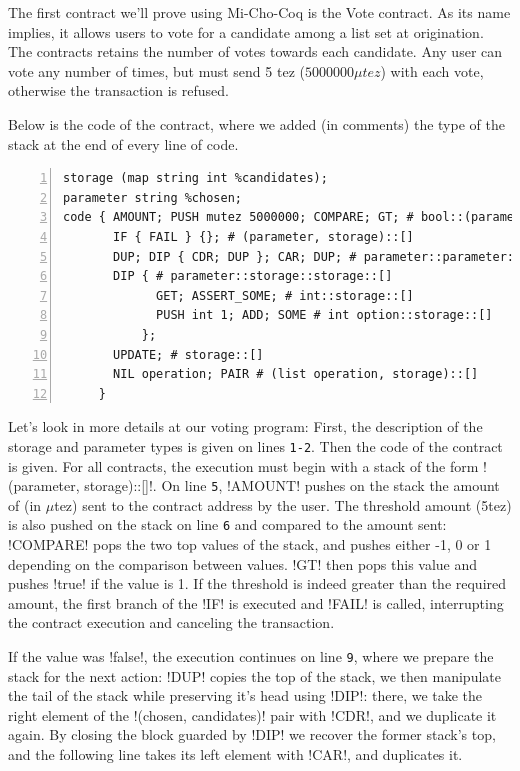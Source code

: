 \documentclass{report}
\begin{document}
The first contract we'll prove using Mi-Cho-Coq is the Vote contract. As its name implies, it allows users to vote for a candidate among a list set at origination. The contracts retains the number of votes towards each candidate. Any user can vote any number of times, but must send 5 tez ($5000000\mu tez$) with each vote, otherwise the transaction is refused.

Below is the code of the contract, where we added (in comments) the type of the stack at the end of every line of code.

\begin{lstlisting}[language=michelson,numbers=left]
storage (map string int %candidates);
parameter string %chosen;
code { AMOUNT; PUSH mutez 5000000; COMPARE; GT; # bool::(parameter, storage)::[]
       IF { FAIL } {}; # (parameter, storage)::[]
       DUP; DIP { CDR; DUP }; CAR; DUP; # parameter::parameter::storage::storage::[]
       DIP { # parameter::storage::storage::[]
             GET; ASSERT_SOME; # int::storage::[]
             PUSH int 1; ADD; SOME # int option::storage::[]
           };
       UPDATE; # storage::[]
       NIL operation; PAIR # (list operation, storage)::[]
     }
\end{lstlisting}

Let's look in more details at our voting program: First, the description of the
storage and parameter types is given on lines \texttt{1-2}.  Then the
code of the contract is given.
For all contracts, the execution must begin with a stack of the form !(parameter, storage)::[]!.
On line \texttt{5}, !AMOUNT! pushes on the stack the amount
of (in $\mu$tez) sent to the contract address by the user. The threshold amount
(5tez) is also pushed on the stack on line \texttt{6} and compared to
the amount sent:
!COMPARE! pops the two top values of the stack, and pushes
either -1, 0 or 1 depending on the comparison between
values. !GT! then pops this value and pushes !true!
if the value is 1. If the threshold is indeed greater than the
required amount, the first branch of the !IF! is executed
and !FAIL! is called, interrupting the contract execution
and canceling the transaction.

If the value was !false!, the execution continues on line
\texttt{9}, where we prepare the stack for the next action:
!DUP! copies the top of the stack, we then manipulate the
tail of the stack while preserving it's head using !DIP!:
there, we take the right element of the !(chosen, candidates)! pair
with !CDR!, and we duplicate it again.  By closing the block
guarded by !DIP! we recover the former stack's top, and the following
line takes its left element with !CAR!, and duplicates it.
\end{document}
